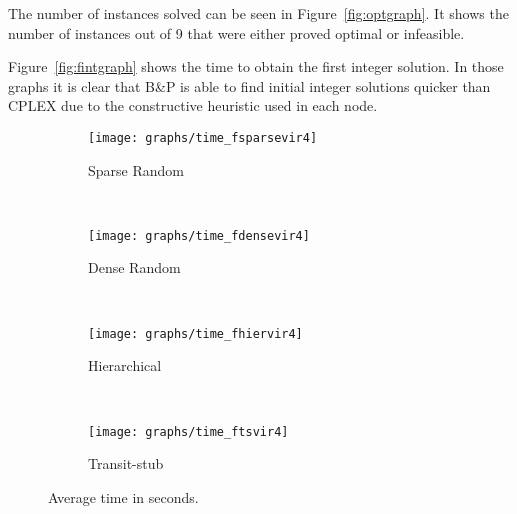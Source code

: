 \documentclass[conference]{IEEEtran}
\begin{document}
The number of instances solved can be seen in Figure~\ref{fig:optgraph}. It shows the number of instances out of 9 that were either proved optimal or infeasible. 

Figure~\ref{fig:fintgraph} shows the time to obtain the first integer solution. In those graphs it is clear that B\&P is able to find initial integer solutions quicker than CPLEX due to the constructive heuristic used in each node.

\begin{figure*}
        \centering
        \begin{subfigure}[b]{0.40\textwidth}
                \texttt{[image: graphs/time\_fsparsevir4]}
                \caption{Sparse Random}
                \label{fig:s11}
        \end{subfigure}
        ~ 
        \begin{subfigure}[b]{0.4\textwidth}
                \texttt{[image: graphs/time\_fdensevir4]}
                \caption{Dense Random}
                \label{fig:d11}
        \end{subfigure}
        \\
        \begin{subfigure}[b]{0.4\textwidth}
                \texttt{[image: graphs/time\_fhiervir4]}
                \caption{Hierarchical}
                \label{fig:h11}
        \end{subfigure}
        ~ 
        \begin{subfigure}[b]{0.4\textwidth}
                \texttt{[image: graphs/time\_ftsvir4]}
                \caption{Transit-stub}
                \label{fig:tstime}
        \end{subfigure}
        \caption{Average time in seconds.}\label{fig:timegraph}
\end{figure*}
\end{document}
